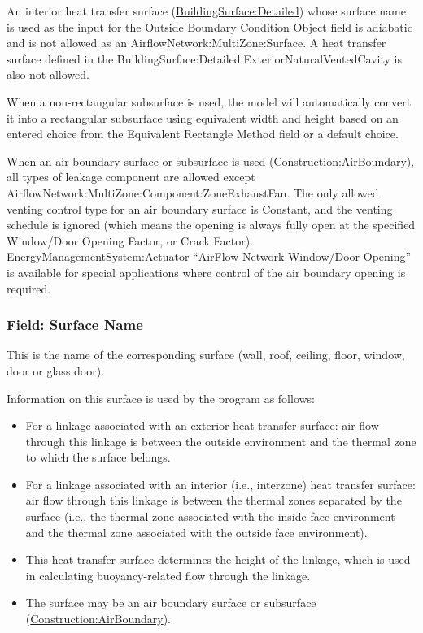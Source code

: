 An interior heat transfer surface (\hyperref[buildingsurfacedetailed]{BuildingSurface:Detailed}) whose surface name is used as the input for the Outside Boundary Condition Object field is adiabatic and is not allowed as an AirflowNetwork:MultiZone:Surface. A heat transfer surface defined in the BuildingSurface:Detailed:ExteriorNaturalVentedCavity is also not allowed.

When a non-rectangular subsurface is used, the model will automatically convert it into a rectangular subsurface using equivalent width and height based on an entered choice from the Equivalent Rectangle Method field or a default choice.

When an air boundary surface or subsurface is used (\hyperref[constructionairboundary]{Construction:AirBoundary}), all types of leakage component are allowed except AirflowNetwork:MultiZone:Component:ZoneExhaustFan. The only allowed venting control type for an air boundary surface is Constant, and the venting schedule is ignored (which means the opening is always fully open at the specified Window/Door Opening Factor, or Crack Factor). EnergyManagementSystem:Actuator ``AirFlow Network Window/Door Opening'' is available for special applications where control of the air boundary opening is required.

\subsubsection{Field: Surface Name}\label{field-surface-name-000}

This is the name of the corresponding surface (wall, roof, ceiling, floor, window, door or glass door).

Information on this surface is used by the program as follows:

\begin{itemize}
\item
For a linkage associated with an exterior heat transfer surface: air flow through this linkage is between the outside environment and the thermal zone to which the surface belongs.

\item
For a linkage associated with an interior (i.e., interzone) heat transfer surface: air flow through this linkage is between the thermal zones separated by the surface (i.e., the thermal zone associated with the inside face environment and the thermal zone associated with the outside face environment).

\item
This heat transfer surface determines the height of the linkage, which is used in calculating buoyancy-related flow through the linkage.

\item
The surface may be an air boundary surface or subsurface (\hyperref[constructionairboundary]{Construction:AirBoundary}).
\end{itemize}

